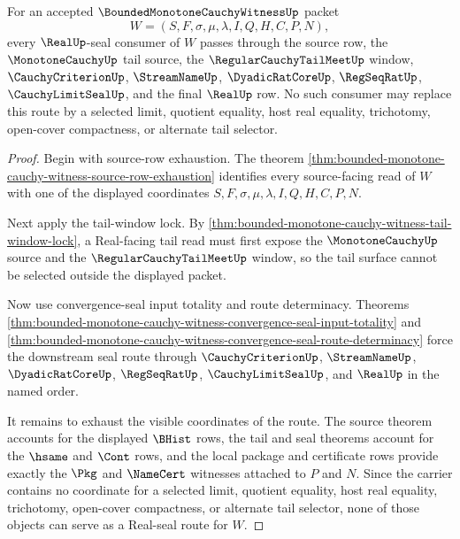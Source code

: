 \begin{theorem}
\label{thm:bounded-monotone-cauchy-witness-tail-real-seal-route-totality}
For an accepted $\BoundedMonotoneCauchyWitnessUp$ packet
$$
W=(S,F,\sigma,\mu,\lambda,I,Q,H,C,P,N),
$$
every $\RealUp$-seal consumer of $W$ passes through the source row, the $\MonotoneCauchyUp$ tail source, the $\RegularCauchyTailMeetUp$ window, $\CauchyCriterionUp$, $\StreamNameUp$, $\DyadicRatCoreUp$, $\RegSeqRatUp$, $\CauchyLimitSealUp$, and the final $\RealUp$ row. No such consumer may replace this route by a selected limit, quotient equality, host real equality, trichotomy, open-cover compactness, or alternate tail selector.
\end{theorem}
\begin{proof}
Begin with source-row exhaustion. The theorem \autoref{thm:bounded-monotone-cauchy-witness-source-row-exhaustion} identifies every source-facing read of $W$ with one of the displayed coordinates $S,F,\sigma,\mu,\lambda,I,Q,H,C,P,N$.

Next apply the tail-window lock. By \autoref{thm:bounded-monotone-cauchy-witness-tail-window-lock}, a Real-facing tail read must first expose the $\MonotoneCauchyUp$ source and the $\RegularCauchyTailMeetUp$ window, so the tail surface cannot be selected outside the displayed packet.

Now use convergence-seal input totality and route determinacy. Theorems \autoref{thm:bounded-monotone-cauchy-witness-convergence-seal-input-totality} and \autoref{thm:bounded-monotone-cauchy-witness-convergence-seal-route-determinacy} force the downstream seal route through $\CauchyCriterionUp$, $\StreamNameUp$, $\DyadicRatCoreUp$, $\RegSeqRatUp$, $\CauchyLimitSealUp$, and $\RealUp$ in the named order.

It remains to exhaust the visible coordinates of the route. The source theorem accounts for the displayed $\BHist$ rows, the tail and seal theorems account for the $\hsame$ and $\Cont$ rows, and the local package and certificate rows provide exactly the $\Pkg$ and $\NameCert$ witnesses attached to $P$ and $N$. Since the carrier contains no coordinate for a selected limit, quotient equality, host real equality, trichotomy, open-cover compactness, or alternate tail selector, none of those objects can serve as a Real-seal route for $W$.
\end{proof}


